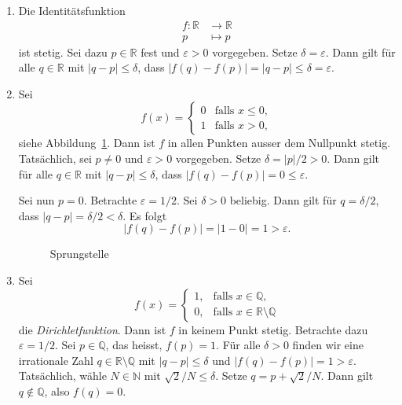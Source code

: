 \documentclass[../main.tex]{subfiles}
\begin{document}
\begin{examples}
  \leavevmode
  \begin{enumerate}[(1)]
    \item Die Identitätsfunktion
      \begin{align*}
        f \colon \mathbb{R} & \to \mathbb{R} \\
        p & \mapsto p
      \end{align*}
      ist stetig. Sei dazu $p \in \mathbb{R}$ fest
      und $\varepsilon > 0$ vorgegeben.
      Setze $\delta = \varepsilon$. Dann gilt
      für alle $q \in \mathbb{R}$ mit
      $|q - p| \leq \delta$, dass
      $|f(q) - f(p)| = |q - p| \leq \delta = \varepsilon$.
    \item Sei
      \[
        f(x) = 
        \begin{cases}
          0 & \text{falls } x \leq 0, \\
          1 & \text{falls } x > 0,
        \end{cases}
      \]
      siehe Abbildung~\ref{fig:jump}.
      Dann ist $f$ in allen Punkten ausser dem
      Nullpunkt stetig.
      Tatsächlich, sei $p \neq 0$
      und $\varepsilon > 0$ 
      vorgegeben.
      Setze $\delta = |p|/2 > 0$.
      Dann gilt für alle $q \in \mathbb{R}$ 
      mit $|q - p| \leq \delta$, dass
      $|f(q) - f(p)| = 0 \leq \varepsilon$.
      
      Sei nun $p = 0$. Betrachte $\varepsilon = 1/2$.
      Sei $\delta > 0$ beliebig.
      Dann gilt für $q = \delta/2$, dass
      $|q - p| = \delta/2 < \delta$.
      Es folgt
      \[
        |f(q) - f(p)| = |1 - 0| = 1 > \varepsilon.
      \]
      \begin{figure}[htb]
        \centering
      
        \caption{Sprungstelle}%
        \label{fig:jump}
      \end{figure}

    \item Sei
      \[
        f(x) = 
        \begin{cases}
          1, & \text{falls } x \in \mathbb{Q}, \\
        0,& \text{falls } x \in \mathbb{R} \setminus \mathbb{Q}
        \end{cases}
      \]
      die \emph{Dirichletfunktion}.
      Dann ist $f$ in keinem Punkt stetig.
      Betrachte dazu $\varepsilon = 1/2$.
      Sei $p \in \mathbb{Q}$, das heisst, $f(p) = 1$.
      Für alle $\delta > 0$ finden wir eine
      irrationale Zahl
      $q \in \mathbb{R} \setminus \mathbb{Q}$ mit
      $|q - p| \leq \delta$ 
      und
      $|f(q) - f(p)| = 1 > \varepsilon$.
      Tatsächlich, wähle $N \in \mathbb{N}$ 
      mit $\sqrt 2 / N \leq \delta$.
      Setze
      $q = p +\sqrt 2/N$. Dann gilt  $q \notin \mathbb{Q}$,
      also $f(q) = 0$.


\end{enumerate}
\end{examples}
\end{document}
